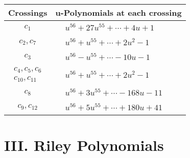 \documentclass[1p]{elsarticle_modified}
\theoremstyle{definition}
\begin{document}
\begin{tabular}{m{50pt}|m{274pt}}
Crossings & \hspace{64pt}u-Polynomials at each crossing \\
\hline $$\begin{aligned}c_{1}\end{aligned}$$&$\begin{aligned}
&u^{56}+27 u^{55}+\cdots+4 u+1
\end{aligned}$\\
\hline $$\begin{aligned}c_{2},c_{7}\end{aligned}$$&$\begin{aligned}
&u^{56}+u^{55}+\cdots+2 u^2-1
\end{aligned}$\\
\hline $$\begin{aligned}c_{3}\end{aligned}$$&$\begin{aligned}
&u^{56}- u^{55}+\cdots-10 u-1
\end{aligned}$\\
\hline $$\begin{aligned}c_{4},c_{5},c_{6}\\c_{10},c_{11}\end{aligned}$$&$\begin{aligned}
&u^{56}+u^{55}+\cdots+2 u^2-1
\end{aligned}$\\
\hline $$\begin{aligned}c_{8}\end{aligned}$$&$\begin{aligned}
&u^{56}+3 u^{55}+\cdots-168 u-11
\end{aligned}$\\
\hline $$\begin{aligned}c_{9},c_{12}\end{aligned}$$&$\begin{aligned}
&u^{56}+5 u^{55}+\cdots+180 u+41
\end{aligned}$\\
\hline
\end{tabular}\newpage\renewcommand{\arraystretch}{1}
\centering \section*{ III. Riley Polynomials}
\end{document}
